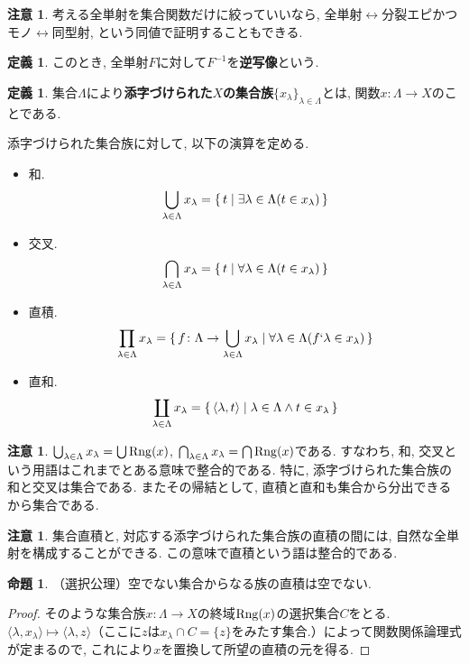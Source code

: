 \documentclass[a4paper, twoside]{bxjsarticle}
\theoremstyle{definition}
\newtheorem{prop}[thm]{命題}
\newtheorem{defn}[thm]{定義}
\newtheorem{rem}[thm]{注意}
\begin{document}
        \begin{rem}
            考える全単射を集合関数だけに絞っていいなら, 全単射$\leftrightarrow$分裂エピかつモノ$\leftrightarrow$同型射, という同値で証明することもできる.
        \end{rem}
        \begin{defn}
            このとき, 全単射$F$に対して$F^{-1}$を\textbf{逆写像}という.
        \end{defn}
        \begin{defn}
            集合$\Lambda$により\textbf{添字づけられた$X$の集合族}$\{x_\lambda\}_{\lambda\in\Lambda}$とは, 関数$x\colon\Lambda\to X$のことである.
            
            添字づけられた集合族に対して, 以下の演算を定める.
            \begin{itemize}
                \item 和.\[\bigcup_{\lambda\in\Lambda} x_\lambda = \set{t|\exists \lambda \in \Lambda(t\in x_\lambda)}\]
                \item 交叉.\[\bigcap_{\lambda\in\Lambda} x_\lambda = \set{t|\forall \lambda \in \Lambda(t\in x_\lambda)}\]
                \item 直積.\[\prod_{\lambda\in\Lambda} x_\lambda = \set{f\colon\Lambda\to\bigcup_{\lambda\in\Lambda} x_\lambda|\forall \lambda \in \Lambda(f`\lambda\in x_\lambda)}\]
                \item 直和.\[\coprod_{\lambda\in\Lambda} x_\lambda = \set{\langle \lambda, t \rangle|\lambda \in \Lambda \land t\in x_\lambda}\]
            \end{itemize}
        \end{defn}
        \begin{rem}
            $\bigcup_{\lambda\in\Lambda} x_\lambda = \bigcup{\rm Rng}(x)$, $\bigcap_{\lambda\in\Lambda} x_\lambda = \bigcap{\rm Rng}(x)$である. すなわち, 和, 交叉という用語はこれまでとある意味で整合的である. 特に, 添字づけられた集合族の和と交叉は集合である. またその帰結として, 直積と直和も集合から分出できるから集合である.
        \end{rem}
        \begin{rem}
            集合直積と, 対応する添字づけられた集合族の直積の間には, 自然な全単射を構成することができる. この意味で直積という語は整合的である.
        \end{rem}
        \begin{prop}
            （選択公理）空でない集合からなる族の直積は空でない.
        \end{prop}
        \begin{proof}
            そのような集合族$x\colon\Lambda\to X$の終域${\rm Rng}(x)$の選択集合$C$をとる. $\langle \lambda, x_\lambda\rangle \mapsto \langle \lambda, z\rangle$（ここに$z$は$x_\lambda\cap C = \{z\}$をみたす集合.）によって関数関係論理式が定まるので, これにより$x$を置換して所望の直積の元を得る.
        \end{proof}
\end{document}
